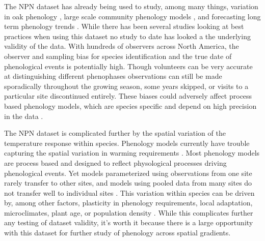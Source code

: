 \documentclass[fleqn,10pt,lineno]{wlpeerj} %
\begin{document}
The NPN dataset has already being used to study, among many things, variation in oak phenology \citep{gerst2017}, large scale community phenology models \citep{melaas2016}, and forecasting long term phenology trends \citep{jeong2013}. While there has been several studies looking at best practices when using this dataset \citep{crimmins2017, gerst2016} no study to date has looked a the underlying validity of the data. With hundreds of observers across North America, the observer and sampling bias for species identification and the true date of phenological events is potentially high. Though volunteers can be very accurate at distinguishing different phenophases \citep{fuccillo2015} observations can still be made sporadically throughout the growing season, some years skipped, or visits to a particular site discontinued entirely. These biases could adversely affect process based phenology models, which are species specific and depend on high precision in the data \citep{chuine2000}.

The NPN dataset is complicated further by the spatial variation of the temperature response within species. Phenology models currently have trouble capturing the spatial variation in warming requirements \citep{garcia-mozo2008, xu2013, olsson2014, basler2016}. Most phenology models are process based and designed to reflect physological processes driving phenological events. Yet models parameterized using observations from one site rarely transfer to other sites, and models using pooled data from many sites do not transfer well to individual sites \citep{garcia-mozo2008, basler2016}. This variation within species can be driven by, among other factors, plasticity in phenology requirements, local adaptation, microclimates, plant age, or population density \citep{kramer1995,diez2012}. While this complicates further any testing of dataset validity, it's worth it because there is a large opportunity with this dataset for further study of phenology across spatial gradients. 
\end{document}
